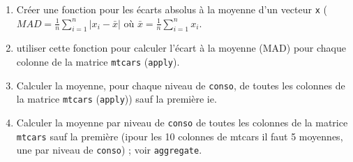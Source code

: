 \documentclass[a4paper,10pt,french]{article}
\begin{document}
\begin{enumerate}
\begin{itemize}
\end{itemize}
\item Créer une fonction pour les écarts absolus à la moyenne d'un
  vecteur \texttt{x} ($MAD=\frac{1}{n}\sum_{i=1}^n{}{|x_i-\bar x|}$ où $\bar
  x=\frac{1}{n}\sum_{i=1}^{n}{x_i}$. 
\item utiliser cette fonction pour calculer l'écart à la moyenne (MAD) pour chaque colonne de la matrice \texttt{mtcars} (\texttt{apply}). 
\item Calculer la moyenne, pour chaque niveau de \texttt{conso}, de toutes les colonnes de la matrice \texttt{mtcars} (\texttt{apply})) sauf la première ie. 
\item Calculer la moyenne par niveau de \texttt{conso} de toutes les colonnes de la matrice \texttt{mtcars} sauf la première (ipour les 10 colonnes de mtcars il faut 5 moyennes, une par niveau de \texttt{conso}) ; voir \texttt{aggregate}. 
\end{enumerate}
\end{document}

